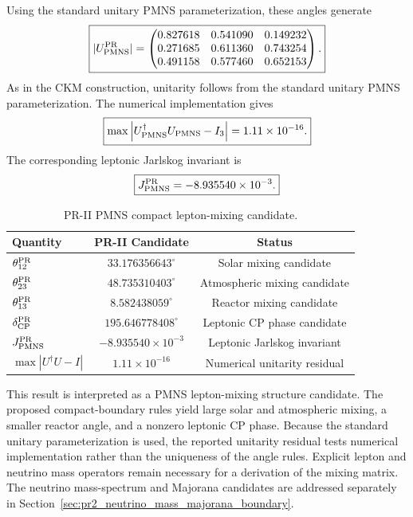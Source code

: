 \documentclass[11pt]{article}
\renewcommand{\arraystretch}{1.22}
\renewcommand{\arraystretch}{1.4}
\begin{document}
Using the standard unitary PMNS parameterization, these angles generate
\begin{equation}
\boxed{
|U_{\rm PMNS}^{\rm PR}|
=
\begin{pmatrix}
0.827618 & 0.541090 & 0.149232\\
0.271685 & 0.611360 & 0.743254\\
0.491158 & 0.577460 & 0.652153
\end{pmatrix}.
}
\end{equation}
As in the CKM construction, unitarity follows from the standard unitary PMNS parameterization. The numerical implementation gives
\begin{equation}
\boxed{
\max
\left|
U_{\rm PMNS}^{\dagger}U_{\rm PMNS}-I_3
\right|
=
1.11\times10^{-16}.
}
\end{equation}
The corresponding leptonic Jarlskog invariant is
\begin{equation}
\boxed{
J_{\rm PMNS}^{\rm PR}
=
-8.935540\times10^{-3}.
}
\end{equation}

\begin{table}[ht!]
\centering
\caption{PR-II PMNS compact lepton-mixing candidate.}
\label{tab:pr2_pmns_candidate_main}
\small
\renewcommand{\arraystretch}{1.25}
\begin{tabular}{lcc}
\hline
\textbf{Quantity} & \textbf{PR-II Candidate} & \textbf{Status} \\ \hline
\(\theta_{12}^{\rm PR}\) 
& \(33.176356643^\circ\) 
& Solar mixing candidate \\

\(\theta_{23}^{\rm PR}\) 
& \(48.735310403^\circ\) 
& Atmospheric mixing candidate \\

\(\theta_{13}^{\rm PR}\) 
& \(8.582438059^\circ\) 
& Reactor mixing candidate \\

\(\delta_{\rm CP}^{\rm PR}\) 
& \(195.646778408^\circ\) 
& Leptonic CP phase candidate \\

\(J_{\rm PMNS}^{\rm PR}\) 
& \(-8.935540\times10^{-3}\) 
& Leptonic Jarlskog invariant \\

\(\max|U^\dagger U-I|\) 
& \(1.11\times10^{-16}\) 
& Numerical unitarity residual \\ \hline
\end{tabular}
\end{table}

This result is interpreted as a PMNS lepton-mixing structure candidate. The proposed compact-boundary rules yield large solar and atmospheric mixing, a smaller reactor angle, and a nonzero leptonic CP phase. Because the standard unitary parameterization is used, the reported unitarity residual tests numerical implementation rather than the uniqueness of the angle rules. Explicit lepton and neutrino mass operators remain necessary for a derivation of the mixing matrix. The neutrino mass-spectrum and Majorana candidates are addressed separately in Section~\ref{sec:pr2_neutrino_mass_majorana_boundary}.
\end{document}
